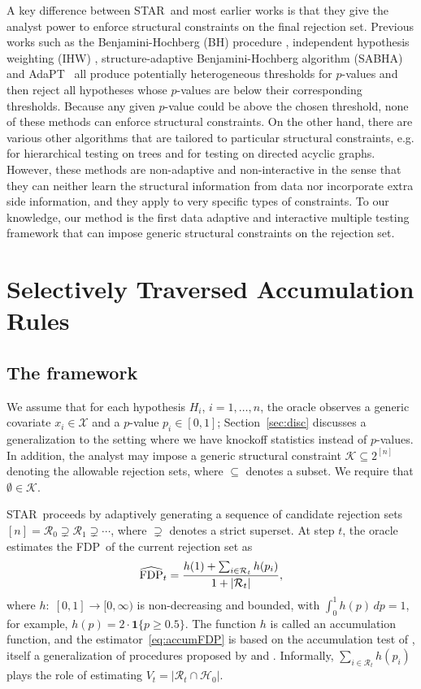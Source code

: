 \documentclass{biometrika}
\newcommand{\cX}{\mathcal{X}}
\newcommand{\cH}{\mathcal{H}}
\newcommand{\cR}{\mathcal{R}}
\newcommand{\cK}{\mathcal{K}}
\newcommand{\textFDP}{FDP}
\renewcommand{\star}{STAR}
\newcommand{\adapt}{AdaPT}
\newcommand{\sabha}{SABHA}
\newcommand{\ihw}{IHW}
\newcommand{\bh}{BH}
\newcommand{\hFDP}{\widehat{\textnormal{FDP}}}
\newcommand{\1}{\mathbf{1}}
\begin{document}
A key difference between \star ~and most earlier works is that they give the analyst power to enforce structural constraints on the final rejection set. 
Previous works such as the Benjamini-Hochberg (\bh) procedure \citep{bh95}, independent hypothesis weighting (\ihw) \citep{ignatiadis2016data}, structure-adaptive Benjamini-Hochberg algorithm (\sabha) \citep{li2019multiple} and \adapt ~\citep{lei2018adapt} all produce potentially heterogeneous thresholds for $p$-values and then reject all hypotheses whose $p$-values are below their corresponding thresholds. Because any given $p$-value could be above the chosen threshold, none of these methods can enforce structural constraints. 
On the other hand, there are various other algorithms that are tailored to particular structural constraints, e.g. \cite{yekutieli08, lynch16} for hierarchical testing on trees and \cite{lynch16, ramdas2017dagger} for testing on directed acyclic graphs. However, these methods are non-adaptive and non-interactive in the sense that they can neither learn the structural information from data nor incorporate extra side information, and they apply to very specific types of constraints. To our knowledge, our method is the first data adaptive and interactive multiple testing framework that can impose generic structural constraints on the rejection set.

\section{Selectively Traversed Accumulation Rules}\label{sec:STAR}

\subsection{The framework}
We assume that for each hypothesis $H_i$, $i=1,\ldots,n$, the oracle observes a generic covariate $x_i\in \cX$ and a $p$-value $p_i\in [0,1]$; Section~\ref{sec:disc} discusses a generalization to the setting where we have knockoff statistics instead of $p$-values. In addition, the analyst may impose a generic structural constraint $\cK \subseteq 2^{[n]}$ denoting the allowable rejection sets, where $\subseteq$ denotes a subset. We require that $\emptyset \in \cK$.

\star ~proceeds by adaptively generating a sequence of candidate rejection sets $[n] = \cR_0 \supsetneq \cR_1 \supsetneq \cdots$, where $\supsetneq$ denotes a strict superset. At step $t$, the oracle estimates the \textFDP ~of the current rejection set as 
\begin{equation}\label{eq:accumFDP}
\hFDP_t = \frac{h(1) + \sum_{i\in\cR_t}h(p_i)}{1 + |\cR_t|},
\end{equation}
where $h:\; [0,1] \to [0,\infty)$ is non-decreasing and bounded, with $\int_0^1 h(p)\,dp = 1$, for example, $h(p) = 2\cdot \1\{p \geq 0.5\}$. The function $h$ is called an accumulation function, and the estimator~\eqref{eq:accumFDP} is based on the accumulation test of \citet{li2016accumulation}, itself a generalization of procedures proposed by \citet{barber15} and \citet{gsell2016sequential}. Informally, $\sum_{i\in\cR_t}h(p_i)$ plays the role of estimating $V_t = \left|\cR_t \cap \cH_0\right|$.
\end{document}
